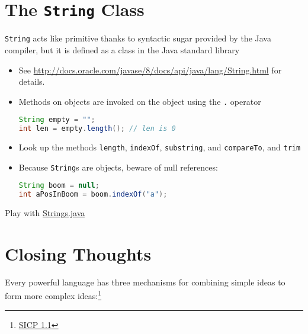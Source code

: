 \documentclass{article}
\begin{document}
\section{The {\tt String} Class}


{\tt String} acts like primitive thanks to syntactic sugar provided by the Java compiler, but it is defined as a class in the Java standard library

\begin{itemize}

\item See \href{http://docs.oracle.com/javase/8/docs/api/java/lang/String.html}{http://docs.oracle.com/javase/8/docs/api/java/lang/String.html} for details.

\item Methods on objects are invoked on the object using the {\tt .} operator
\begin{lstlisting}[language=Java]
String empty = "";
int len = empty.length(); // len is 0
\end{lstlisting}

\item Look up the methods {\tt length}, {\tt indexOf}, {\tt substring}, and {\tt compareTo}, and {\tt trim}

\item Because {\tt String}s are objects, beware of null references:
\begin{lstlisting}[language=Java]
String boom = null;
int aPosInBoom = boom.indexOf("a");
\end{lstlisting}

\end{itemize}

Play with \href{\code/basics/Strings.java}{Strings.java}

\section{Closing Thoughts}

Every powerful language has three mechanisms for  combining simple ideas to form more complex ideas:\footnote{\href{http://mitpress.mit.edu/sicp/full-text/book/book-Z-H-10.html}{SICP 1.1}}
\end{document}
